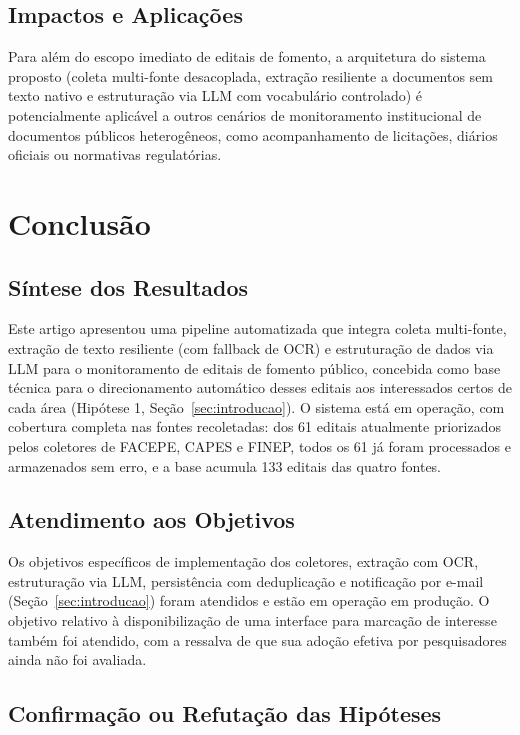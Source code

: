 \documentclass[12pt]{article}
\begin{document}
  \subsection{Impactos e Aplicações}
  Para além do escopo imediato de editais de fomento, a arquitetura do sistema proposto (coleta multi-fonte desacoplada, extração resiliente a documentos sem texto nativo e estruturação via LLM com vocabulário controlado) é potencialmente aplicável a outros cenários de monitoramento institucional de documentos públicos heterogêneos, como acompanhamento de licitações, diários oficiais ou normativas regulatórias.

  \section{Conclusão}\label{sec:conclusao}

  \subsection{Síntese dos Resultados}
  Este artigo apresentou uma pipeline automatizada que integra coleta multi-fonte, extração de texto resiliente (com fallback de OCR) e estruturação de dados via LLM para o monitoramento de editais de fomento público, concebida como base técnica para o direcionamento automático desses editais aos interessados certos de cada área (Hipótese 1, Seção~\ref{sec:introducao}). O sistema está em operação, com cobertura completa nas fontes recoletadas: dos 61 editais atualmente priorizados pelos coletores de FACEPE, CAPES e FINEP, todos os 61 já foram processados e armazenados sem erro, e a base acumula 133 editais das quatro fontes.

  \subsection{Atendimento aos Objetivos}
  Os objetivos específicos de implementação dos coletores, extração com OCR, estruturação via LLM, persistência com deduplicação e notificação por e-mail (Seção~\ref{sec:introducao}) foram atendidos e estão em operação em produção. O objetivo relativo à disponibilização de uma interface para marcação de interesse também foi atendido, com a ressalva de que sua adoção efetiva por pesquisadores ainda não foi avaliada.

  \subsection{Confirmação ou Refutação das Hipóteses}
\end{document}
